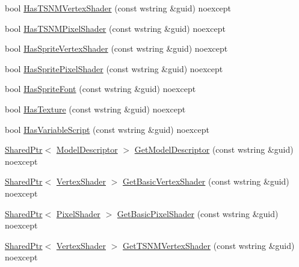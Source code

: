 \begin{DoxyCompactItemize}
\item 
bool \hyperlink{classmage_1_1_resource_manager_aaed0648fcca9ef8c5ea901adf8691eb2}{Has\+T\+S\+N\+M\+Vertex\+Shader} (const wstring \&guid) noexcept
\item 
bool \hyperlink{classmage_1_1_resource_manager_a3aeb6ce19c392b82fd4268525478fc3d}{Has\+T\+S\+N\+M\+Pixel\+Shader} (const wstring \&guid) noexcept
\item 
bool \hyperlink{classmage_1_1_resource_manager_a03b2fd29460628ae0be3ec634c9a9683}{Has\+Sprite\+Vertex\+Shader} (const wstring \&guid) noexcept
\item 
bool \hyperlink{classmage_1_1_resource_manager_ae1a4a3a8d98ecbf3c585464d0edd0c9f}{Has\+Sprite\+Pixel\+Shader} (const wstring \&guid) noexcept
\item 
bool \hyperlink{classmage_1_1_resource_manager_a505a5b25923d88020d85a2f3307e4b7f}{Has\+Sprite\+Font} (const wstring \&guid) noexcept
\item 
bool \hyperlink{classmage_1_1_resource_manager_a617768fb9ec0c7c8f00b3f34c6386dfa}{Has\+Texture} (const wstring \&guid) noexcept
\item 
bool \hyperlink{classmage_1_1_resource_manager_a34d72d4729102af23d73438eea629e02}{Has\+Variable\+Script} (const wstring \&guid) noexcept
\item 
\hyperlink{namespacemage_a1e01ae66713838a7a67d30e44c67703e}{Shared\+Ptr}$<$ \hyperlink{classmage_1_1_model_descriptor}{Model\+Descriptor} $>$ \hyperlink{classmage_1_1_resource_manager_a93d34fd42062d9901435c8c469e7ecdf}{Get\+Model\+Descriptor} (const wstring \&guid) noexcept
\item 
\hyperlink{namespacemage_a1e01ae66713838a7a67d30e44c67703e}{Shared\+Ptr}$<$ \hyperlink{classmage_1_1_vertex_shader}{Vertex\+Shader} $>$ \hyperlink{classmage_1_1_resource_manager_a4a2b80e522616f6c5f23eae197f5c3dd}{Get\+Basic\+Vertex\+Shader} (const wstring \&guid) noexcept
\item 
\hyperlink{namespacemage_a1e01ae66713838a7a67d30e44c67703e}{Shared\+Ptr}$<$ \hyperlink{classmage_1_1_pixel_shader}{Pixel\+Shader} $>$ \hyperlink{classmage_1_1_resource_manager_a68ad57f1d907c348540f94810e7b3fe0}{Get\+Basic\+Pixel\+Shader} (const wstring \&guid) noexcept
\item 
\hyperlink{namespacemage_a1e01ae66713838a7a67d30e44c67703e}{Shared\+Ptr}$<$ \hyperlink{classmage_1_1_vertex_shader}{Vertex\+Shader} $>$ \hyperlink{classmage_1_1_resource_manager_a3d0d4eb02b76a865117392d2db6de44d}{Get\+T\+S\+N\+M\+Vertex\+Shader} (const wstring \&guid) noexcept
\item 

\end{DoxyCompactItemize}
